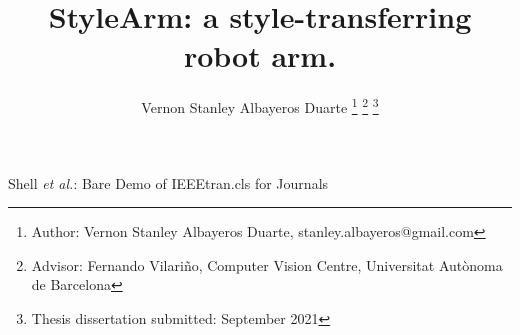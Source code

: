 \documentclass[journal,onecolumn]{IEEEtran}
\begin{document}
%
\title{ StyleArm: a style-transferring robot arm.}
%
%
%

\author{ Vernon Stanley Albayeros Duarte%
\thanks{Author: Vernon Stanley Albayeros Duarte, stanley.albayeros@gmail.com}%
\thanks{Advisor: Fernando Vilariño, Computer Vision Centre,  Universitat Autònoma de Barcelona }%
\thanks{Thesis dissertation submitted: September 2021}}

% 
%



%
{Shell \MakeLowercase{\textit{et al.}}: Bare Demo of IEEEtran.cls for Journals}
% 
\end{document}
